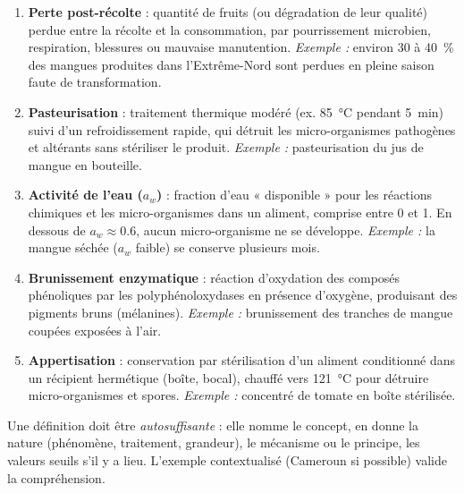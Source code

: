 \documentclass[11pt]{article}
\begin{document}
\begin{corrige}
\begin{enumerate}
\item \textbf{Perte post-récolte} : quantité de fruits (ou dégradation de leur qualité) perdue entre la récolte et la consommation, par pourrissement microbien, respiration, blessures ou mauvaise manutention. \emph{Exemple :} environ $30$ à \SI{40}{\percent} des mangues produites dans l'Extrême-Nord sont perdues en pleine saison faute de transformation.
\item \textbf{Pasteurisation} : traitement thermique modéré (ex. \SI{85}{\celsius} pendant \SI{5}{min}) suivi d'un refroidissement rapide, qui détruit les micro-organismes pathogènes et altérants sans stériliser le produit. \emph{Exemple :} pasteurisation du jus de mangue en bouteille.
\item \textbf{Activité de l'eau ($a_w$)} : fraction d'eau « disponible » pour les réactions chimiques et les micro-organismes dans un aliment, comprise entre 0 et 1. En dessous de $a_w \approx \num{0,6}$, aucun micro-organisme ne se développe. \emph{Exemple :} la mangue séchée ($a_w$ faible) se conserve plusieurs mois.
\item \textbf{Brunissement enzymatique} : réaction d'oxydation des composés phénoliques par les polyphénoloxydases en présence d'oxygène, produisant des pigments bruns (mélanines). \emph{Exemple :} brunissement des tranches de mangue coupées exposées à l'air.
\item \textbf{Appertisation} : conservation par stérilisation d'un aliment conditionné dans un récipient hermétique (boîte, bocal), chauffé vers \SI{121}{\celsius} pour détruire micro-organismes et spores. \emph{Exemple :} concentré de tomate en boîte stérilisée.
\end{enumerate}
\end{corrige}

\begin{attention}
Une définition doit être \emph{autosuffisante} : elle nomme le concept, en donne la nature (phénomène, traitement, grandeur), le mécanisme ou le principe, les valeurs seuils s'il y a lieu. L'exemple contextualisé (Cameroun si possible) valide la compréhension.
\end{attention}
\end{document}
